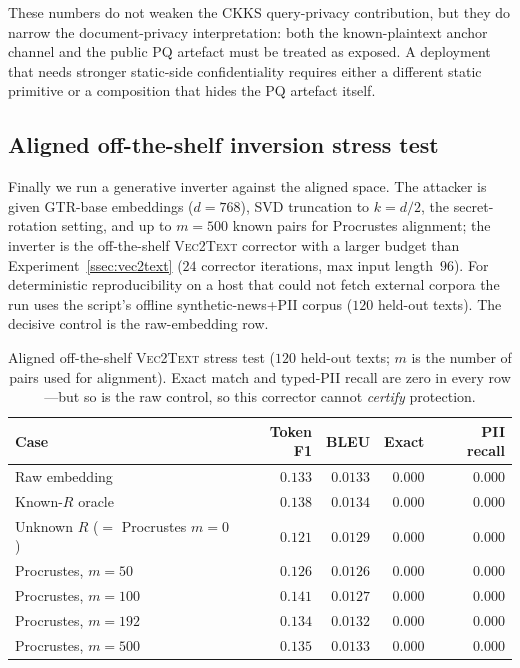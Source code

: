 \documentclass[11pt,a4paper]{article}
\begin{document}
These numbers do not weaken the CKKS query-privacy contribution, but they
do narrow the document-privacy interpretation: both the known-plaintext
anchor channel and the public PQ artefact must be treated as exposed. A
deployment that needs stronger static-side confidentiality requires either
a different static primitive or a composition that hides the PQ artefact
itself.

\subsection{Aligned off-the-shelf inversion stress test}
\label{ssec:aligned}

Finally we run a generative inverter against the aligned space. The
attacker is given GTR-base embeddings ($d=768$), SVD truncation to
$k=d/2$, the secret-rotation setting, and up to $m=500$ known pairs for
Procrustes alignment; the inverter is the off-the-shelf \textsc{Vec2Text}
corrector with a larger budget than Experiment~\ref{ssec:vec2text} ($24$
corrector iterations, max input length~$96$). For deterministic
reproducibility on a host that could not fetch external corpora the run
uses the script's offline synthetic-news+PII corpus ($120$ held-out
texts). The decisive control is the raw-embedding row.

\begin{table}[tbp]
\centering
\caption{Aligned off-the-shelf \textsc{Vec2Text} stress test ($120$
held-out texts; $m$ is the number of pairs used for alignment). Exact
match and typed-PII recall are zero in every row---but so is the raw
control, so this corrector cannot \emph{certify} protection.}
\label{tab:adaptive-inversion}
\small
\begin{tabular}{@{}lrrrr@{}}
\toprule
Case & Token F1 & BLEU & Exact & PII recall \\ \midrule
Raw embedding & $0.133$ & $0.0133$ & $0.000$ & $0.000$ \\
Known-$R$ oracle & $0.138$ & $0.0134$ & $0.000$ & $0.000$ \\
Unknown $R$ ($=$ Procrustes $m{=}0$) & $0.121$ & $0.0129$ & $0.000$ & $0.000$ \\
Procrustes, $m=50$ & $0.126$ & $0.0126$ & $0.000$ & $0.000$ \\
Procrustes, $m=100$ & $0.141$ & $0.0127$ & $0.000$ & $0.000$ \\
Procrustes, $m=192$ & $0.134$ & $0.0132$ & $0.000$ & $0.000$ \\
Procrustes, $m=500$ & $0.135$ & $0.0133$ & $0.000$ & $0.000$ \\
\bottomrule
\end{tabular}
\end{table}
\end{document}
